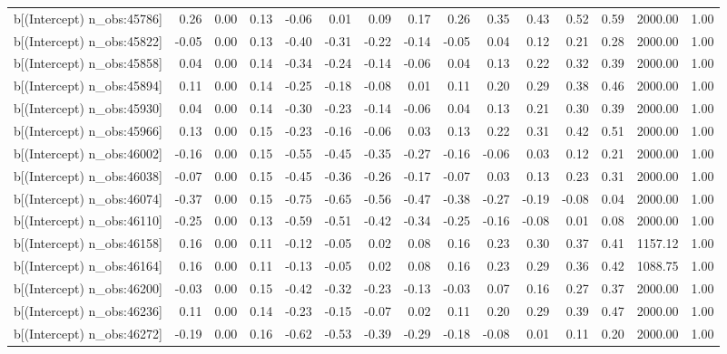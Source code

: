 \begin{table}[ht]
\begin{tabular}{rrrrrrrrrrrrrrr}
  b[(Intercept) n\_obs:45786] & 0.26 & 0.00 & 0.13 & -0.06 & 0.01 & 0.09 & 0.17 & 0.26 & 0.35 & 0.43 & 0.52 & 0.59 & 2000.00 & 1.00 \\ 
  b[(Intercept) n\_obs:45822] & -0.05 & 0.00 & 0.13 & -0.40 & -0.31 & -0.22 & -0.14 & -0.05 & 0.04 & 0.12 & 0.21 & 0.28 & 2000.00 & 1.00 \\ 
  b[(Intercept) n\_obs:45858] & 0.04 & 0.00 & 0.14 & -0.34 & -0.24 & -0.14 & -0.06 & 0.04 & 0.13 & 0.22 & 0.32 & 0.39 & 2000.00 & 1.00 \\ 
  b[(Intercept) n\_obs:45894] & 0.11 & 0.00 & 0.14 & -0.25 & -0.18 & -0.08 & 0.01 & 0.11 & 0.20 & 0.29 & 0.38 & 0.46 & 2000.00 & 1.00 \\ 
  b[(Intercept) n\_obs:45930] & 0.04 & 0.00 & 0.14 & -0.30 & -0.23 & -0.14 & -0.06 & 0.04 & 0.13 & 0.21 & 0.30 & 0.39 & 2000.00 & 1.00 \\ 
  b[(Intercept) n\_obs:45966] & 0.13 & 0.00 & 0.15 & -0.23 & -0.16 & -0.06 & 0.03 & 0.13 & 0.22 & 0.31 & 0.42 & 0.51 & 2000.00 & 1.00 \\ 
  b[(Intercept) n\_obs:46002] & -0.16 & 0.00 & 0.15 & -0.55 & -0.45 & -0.35 & -0.27 & -0.16 & -0.06 & 0.03 & 0.12 & 0.21 & 2000.00 & 1.00 \\ 
  b[(Intercept) n\_obs:46038] & -0.07 & 0.00 & 0.15 & -0.45 & -0.36 & -0.26 & -0.17 & -0.07 & 0.03 & 0.13 & 0.23 & 0.31 & 2000.00 & 1.00 \\ 
  b[(Intercept) n\_obs:46074] & -0.37 & 0.00 & 0.15 & -0.75 & -0.65 & -0.56 & -0.47 & -0.38 & -0.27 & -0.19 & -0.08 & 0.04 & 2000.00 & 1.00 \\ 
  b[(Intercept) n\_obs:46110] & -0.25 & 0.00 & 0.13 & -0.59 & -0.51 & -0.42 & -0.34 & -0.25 & -0.16 & -0.08 & 0.01 & 0.08 & 2000.00 & 1.00 \\ 
  b[(Intercept) n\_obs:46158] & 0.16 & 0.00 & 0.11 & -0.12 & -0.05 & 0.02 & 0.08 & 0.16 & 0.23 & 0.30 & 0.37 & 0.41 & 1157.12 & 1.00 \\ 
  b[(Intercept) n\_obs:46164] & 0.16 & 0.00 & 0.11 & -0.13 & -0.05 & 0.02 & 0.08 & 0.16 & 0.23 & 0.29 & 0.36 & 0.42 & 1088.75 & 1.00 \\ 
  b[(Intercept) n\_obs:46200] & -0.03 & 0.00 & 0.15 & -0.42 & -0.32 & -0.23 & -0.13 & -0.03 & 0.07 & 0.16 & 0.27 & 0.37 & 2000.00 & 1.00 \\ 
  b[(Intercept) n\_obs:46236] & 0.11 & 0.00 & 0.14 & -0.23 & -0.15 & -0.07 & 0.02 & 0.11 & 0.20 & 0.29 & 0.39 & 0.47 & 2000.00 & 1.00 \\ 
  b[(Intercept) n\_obs:46272] & -0.19 & 0.00 & 0.16 & -0.62 & -0.53 & -0.39 & -0.29 & -0.18 & -0.08 & 0.01 & 0.11 & 0.20 & 2000.00 & 1.00 \\ 

\end{tabular}
\end{table}
